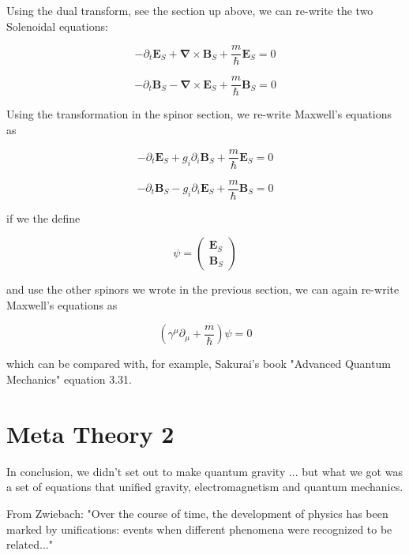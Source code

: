 \documentclass {article}
\renewcommand\vec{\mathbf}
\let\OldS\nabla
\renewcommand{\nabla}{\boldsymbol{\OldS}}
\begin{document}
Using the dual transform, see the section up above, we can re-write the two Solenoidal equations:

$$-\partial_t \vec E_S + \nabla \times \vec B_S   +\frac m {\hbar} \vec E_S = 0 $$ 

$$ -\partial_t \vec B_S - \nabla \times \vec E_S   +\frac m {\hbar} \vec B_S = 0$$ 


Using the transformation in the spinor section, we  re-write Maxwell's equations as 

$$-\partial_t \vec E_S + g_i \partial_i \vec B_S   +\frac m {\hbar} \vec E_S = 0 $$ 

$$ -\partial_t \vec B_S - g_i \partial_i \vec E_S   +\frac m {\hbar} \vec B_S = 0 $$ 


if we the define 

$$\psi = \left(\begin{matrix}  \vec E_S \\ \vec B_S \end{matrix}\right) $$

and use the other spinors we wrote in the previous section, we can again re-write Maxwell's equations as

$$\left(\gamma^{\mu} \partial_{\mu} + \frac m {\hbar} \right) \psi = 0 $$

which can be compared with, for example, Sakurai's book "Advanced Quantum Mechanics" equation 3.31.

\newpage

\section{Meta Theory 2}
In conclusion, we didn't set out to make quantum gravity ... but what we got was a set of equations that unified gravity, electromagnetism and quantum mechanics.

From Zwiebach: "Over the course of time, the development of physics has been marked by unifications: events when different phenomena were recognized to be related..."
\newpage
\end{document}

